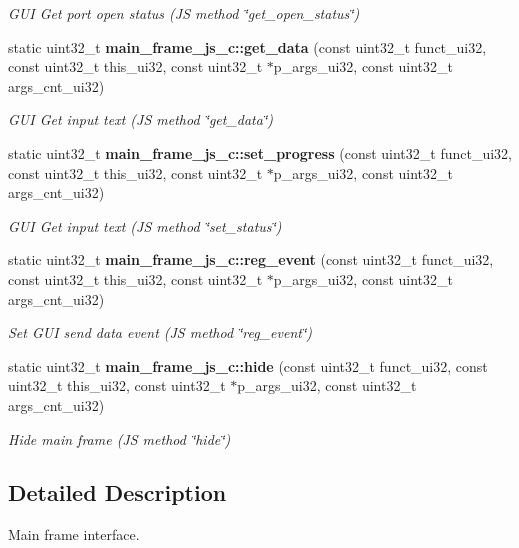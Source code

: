 \begin{DoxyCompactItemize}
\begin{DoxyCompactList}\small\item\em G\+UI Get port open status (JS method \char`\"{}get\+\_\+open\+\_\+status\char`\"{}) \end{DoxyCompactList}\item 
static uint32\+\_\+t \textbf{ main\+\_\+frame\+\_\+js\+\_\+c\+::get\+\_\+data} (const uint32\+\_\+t funct\+\_\+ui32, const uint32\+\_\+t this\+\_\+ui32, const uint32\+\_\+t $\ast$p\+\_\+args\+\_\+ui32, const uint32\+\_\+t args\+\_\+cnt\+\_\+ui32)
\begin{DoxyCompactList}\small\item\em G\+UI Get input text (JS method \char`\"{}get\+\_\+data\char`\"{}) \end{DoxyCompactList}\item 
static uint32\+\_\+t \textbf{ main\+\_\+frame\+\_\+js\+\_\+c\+::set\+\_\+progress} (const uint32\+\_\+t funct\+\_\+ui32, const uint32\+\_\+t this\+\_\+ui32, const uint32\+\_\+t $\ast$p\+\_\+args\+\_\+ui32, const uint32\+\_\+t args\+\_\+cnt\+\_\+ui32)
\begin{DoxyCompactList}\small\item\em G\+UI Get input text (JS method \char`\"{}set\+\_\+status\char`\"{}) \end{DoxyCompactList}\item 
static uint32\+\_\+t \textbf{ main\+\_\+frame\+\_\+js\+\_\+c\+::reg\+\_\+event} (const uint32\+\_\+t funct\+\_\+ui32, const uint32\+\_\+t this\+\_\+ui32, const uint32\+\_\+t $\ast$p\+\_\+args\+\_\+ui32, const uint32\+\_\+t args\+\_\+cnt\+\_\+ui32)
\begin{DoxyCompactList}\small\item\em Set G\+UI send data event (JS method \char`\"{}reg\+\_\+event\char`\"{}) \end{DoxyCompactList}\item 
static uint32\+\_\+t \textbf{ main\+\_\+frame\+\_\+js\+\_\+c\+::hide} (const uint32\+\_\+t funct\+\_\+ui32, const uint32\+\_\+t this\+\_\+ui32, const uint32\+\_\+t $\ast$p\+\_\+args\+\_\+ui32, const uint32\+\_\+t args\+\_\+cnt\+\_\+ui32)
\begin{DoxyCompactList}\small\item\em Hide main frame (JS method \char`\"{}hide\char`\"{}) \end{DoxyCompactList}\end{DoxyCompactItemize}


\subsection{Detailed Description}
Main frame interface. 



